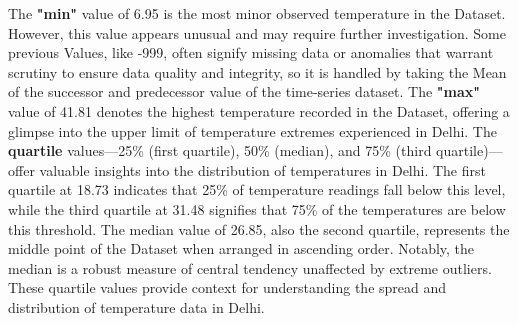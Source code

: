 \documentclass[sn-mathphys,Numbered]{sn-jnl}
\theoremstyle{thmstyleone}
\theoremstyle{thmstyletwo}
\theoremstyle{thmstylethree}
\begin{document}
The \textbf{"min"} value of 6.95 is the most minor observed temperature in the Dataset. However, this value appears unusual and may require further investigation. Some previous Values, like -999, often signify missing data or anomalies that warrant scrutiny to ensure data quality and integrity, so it is handled by taking the Mean of the successor and predecessor value of the time-series dataset. The \textbf{"max"} value of 41.81 denotes the highest temperature recorded in the Dataset, offering a glimpse into the upper limit of temperature extremes experienced in Delhi. The \textbf{quartile} values—25\% (first quartile), 50\% (median), and 75\% (third quartile)—offer valuable insights into the distribution of temperatures in Delhi. The first quartile at 18.73 indicates that 25\% of temperature readings fall below this level, while the third quartile at 31.48 signifies that 75\% of the temperatures are below this threshold. The median value of 26.85, also the second quartile, represents the middle point of the Dataset when arranged in ascending order. Notably, the median is a robust measure of central tendency unaffected by extreme outliers. These quartile values provide context for understanding the spread and distribution of temperature data in Delhi.
\end{document}
